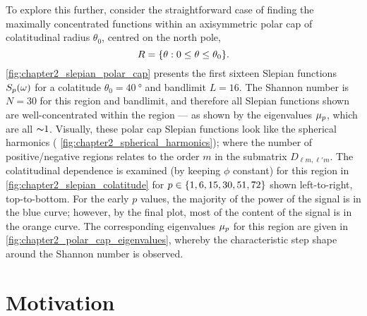 To explore this further, consider the straightforward case of finding the maximally concentrated functions within an axisymmetric polar cap of colatitudinal radius \(\theta_{0}\), centred on the north pole, \ie{}
%
\begin{equation}
	R
	= \{\theta: 0 \leq \theta \leq \theta_{0}\}.
\end{equation}
%
\cref{fig:chapter2_slepian_polar_cap} presents the first sixteen Slepian functions \({S}_{p}(\omega)\) for a colatitude \(\theta_{0}=\SI{40}{\degree}\) and bandlimit \(L=16\).
The Shannon number is \(N=30\) for this region and bandlimit, and therefore all Slepian functions shown are well-concentrated within the region --- as shown by the eigenvalues \({\mu}_{p}\), which are all \({\thicksim}1\).
Visually, these polar cap Slepian functions look like the spherical harmonics (\cf{} \cref{fig:chapter2_spherical_harmonics}); where the number of positive/negative regions relates to the order \(m\) in the submatrix \(D_{\ell m,\ell'm}\).
The colatitudinal dependence is examined (by keeping \(\phi{}\) constant) for this region in \cref{fig:chapter2_slepian_colatitude} for \(p \in \{1,6,15,30,51,72\}\) shown left-to-right, top-to-bottom.
For the early \(p\) values, the majority of the power of the signal is in the blue curve; however, by the final plot, most of the content of the signal is in the orange curve.
The corresponding eigenvalues \({\mu}_{p}\) for this region are given in \cref{fig:chapter2_polar_cap_eigenvalues}, whereby the characteristic step shape around the Shannon number is observed.





\section{Motivation}\label{sec:chapter2_motivation}

